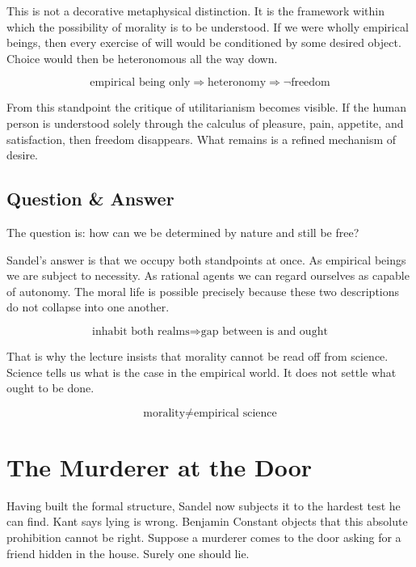 This is not a decorative metaphysical distinction. It is the framework within which the possibility of morality is to be understood. If we were wholly empirical beings, then every exercise of will would be conditioned by some desired object. Choice would then be heteronomous all the way down.

\begin{equation}
\text{empirical being only} \Longrightarrow \text{heteronomy} \Longrightarrow \neg \text{freedom}
\end{equation}

From this standpoint the critique of utilitarianism becomes visible. If the human person is understood solely through the calculus of pleasure, pain, appetite, and satisfaction, then freedom disappears. What remains is a refined mechanism of desire.

\subsection{Question \& Answer}

The question is: how can we be determined by nature and still be free?

Sandel's answer is that we occupy both standpoints at once. As empirical beings we are subject to necessity. As rational agents we can regard ourselves as capable of autonomy. The moral life is possible precisely because these two descriptions do not collapse into one another.

\begin{equation}
\text{inhabit both realms} \Longrightarrow \text{gap between is and ought}
\end{equation}

That is why the lecture insists that morality cannot be read off from science. Science tells us what is the case in the empirical world. It does not settle what ought to be done.

\begin{equation}
\text{morality} \neq \text{empirical science}
\end{equation}

\section{The Murderer at the Door}

Having built the formal structure, Sandel now subjects it to the hardest test he can find. Kant says lying is wrong. Benjamin Constant objects that this absolute prohibition cannot be right. Suppose a murderer comes to the door asking for a friend hidden in the house. Surely one should lie.

